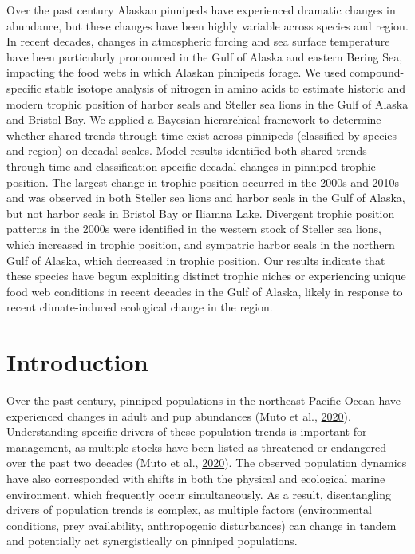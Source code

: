 \documentclass [11pt, proquest] {uwthesis}[2015/03/03]
\begin{document}
Over the past century Alaskan pinnipeds have experienced dramatic
changes in abundance, but these changes have been highly variable across
species and region. In recent decades, changes in atmospheric forcing
and sea surface temperature have been particularly pronounced in the
Gulf of Alaska and eastern Bering Sea, impacting the food webs in which
Alaskan pinnipeds forage. We used compound-specific stable isotope
analysis of nitrogen in amino acids to estimate historic and modern
trophic position of harbor seals and Steller sea lions in the Gulf of
Alaska and Bristol Bay. We applied a Bayesian hierarchical framework to
determine whether shared trends through time exist across pinnipeds
(classified by species and region) on decadal scales. Model results
identified both shared trends through time and classification-specific
decadal changes in pinniped trophic position. The largest change in
trophic position occurred in the 2000s and 2010s and was observed in
both Steller sea lions and harbor seals in the Gulf of Alaska, but not
harbor seals in Bristol Bay or Iliamna Lake. Divergent trophic position
patterns in the 2000s were identified in the western stock of Steller
sea lions, which increased in trophic position, and sympatric harbor
seals in the northern Gulf of Alaska, which decreased in trophic
position. Our results indicate that these species have begun exploiting
distinct trophic niches or experiencing unique food web conditions in
recent decades in the Gulf of Alaska, likely in response to recent
climate-induced ecological change in the region.

\section{Introduction}\label{introduction-4}

Over the past century, pinniped populations in the northeast Pacific
Ocean have experienced changes in adult and pup abundances (Muto et al.,
\protect\hyperlink{ref-Muto2020}{2020}). Understanding specific drivers
of these population trends is important for management, as multiple
stocks have been listed as threatened or endangered over the past two
decades (Muto et al., \protect\hyperlink{ref-Muto2020}{2020}). The
observed population dynamics have also corresponded with shifts in both
the physical and ecological marine environment, which frequently occur
simultaneously. As a result, disentangling drivers of population trends
is complex, as multiple factors (environmental conditions, prey
availability, anthropogenic disturbances) can change in tandem and
potentially act synergistically on pinniped populations.
\end{document}

